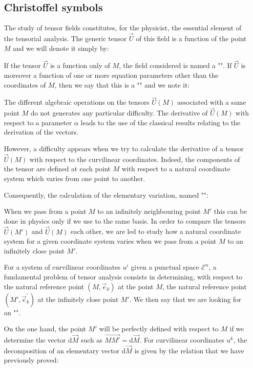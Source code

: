 	
	\pagebreak
	\subsection{Christoffel symbols}
	The study of tensor fields constitutes, for the physicist, the essential element of the tensorial analysis. The generic tensor $\vec{U}$ of this field is a function of the point $M$ and we will denote it simply by:
	
If the tensor $\vec{U}$ is a function only of $M$, the field considered is named a "". If $\vec{U}$ is moreover a function of one or more equation parameters other than the coordinates of $M$, then we say that this is a "" and we note it:
	
	The different algebraic operations on the tensors $\vec{U}(M)$ associated with a same point $M$ do not generates any particular difficulty. The derivative of $\vec{U}(M)$ with respect to a parameter $\alpha$ leads to the use of the classical results relating to the derivation of the vectors.
	
	However, a difficulty appears when we try to calculate the derivative of a tensor $\vec{U}(M)$ with respect to the curvilinear coordinates. Indeed, the components of the tensor are defined at each point $M$ with respect to a natural coordinate system which varies from one point to another.

	Consequently, the calculation of the elementary variation, named "":
	
	When we pass from a point $M$ to an infinitely neighbouring point $M'$ this can be done in physics only if we use to the same basis. In order to compare the tensors $\vec{U}(M')$ and $\vec{U}(M)$ each other, we are led to study how a natural coordinate system for a given coordinate system varies when we pass from a point $M$ to an infinitely close point $M'$.
	
	For a system of curvilinear coordinates $u^i$ given a punctual space $\mathcal{E}^n$, a fundamental problem of tensor analysis consists in determining, with respect to the natural reference point $(M,\vec{e}_k)$ at the point $M$, the natural reference point $(M',\vec{e}_k^{\prime})$ at the infinitely close point $M'$. We then say that we are looking for an "".
	
	On the one hand, the point $M'$ will be perfectly defined with respect to $M$ if we determine the vector $\mathrm{d}\vec{M}$ such as $\overrightarrow{MM'}=\mathrm{d}\vec{M}$. For curvilinear coordinates $u^k$, the decomposition of an elementary vector $\mathrm{d}\vec{M}$ is given by the relation that we have previously proved:
	
